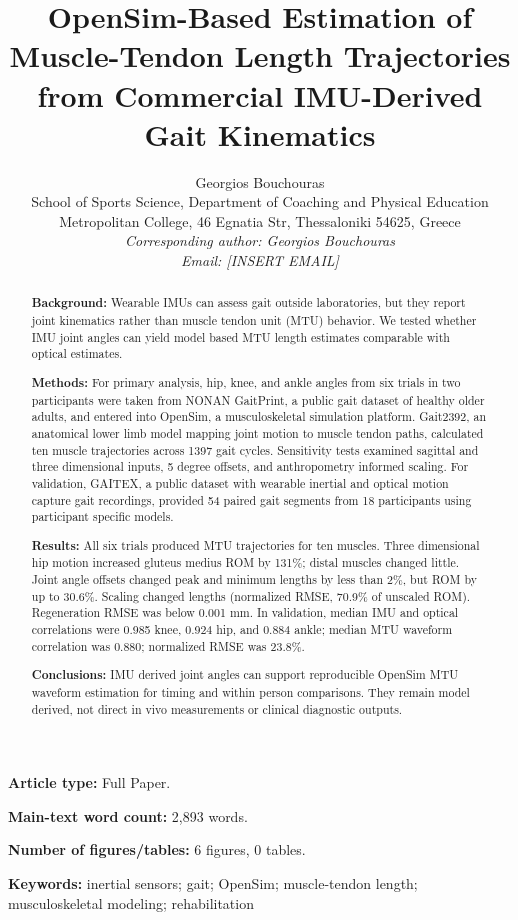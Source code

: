 \documentclass[11pt]{article}
\title{OpenSim-Based Estimation of Muscle-Tendon Length Trajectories\\
from Commercial IMU-Derived Gait Kinematics}
\author{\small Georgios Bouchouras\\
School of Sports Science, Department of Coaching and Physical Education\\
Metropolitan College, 46 Egnatia Str, Thessaloniki 54625, Greece\\
\textit{Corresponding author: Georgios Bouchouras}\\
\textit{Email: [INSERT EMAIL]}}
\date{}
\begin{document}
\maketitle

\noindent\textbf{Article type:} Full Paper.\par
\noindent\textbf{Main-text word count:} 2,893 words.\par
\noindent\textbf{Number of figures/tables:} 6 figures, 0 tables.

\begin{abstract}
\textbf{Background:} Wearable IMUs can assess gait outside laboratories, but they report joint kinematics rather than muscle tendon unit (MTU) behavior. We tested whether IMU joint angles can yield model based MTU length estimates comparable with optical estimates.\par
\textbf{Methods:} For primary analysis, hip, knee, and ankle angles from six trials in two participants were taken from NONAN GaitPrint, a public gait dataset of healthy older adults, and entered into OpenSim, a musculoskeletal simulation platform. Gait2392, an anatomical lower limb model mapping joint motion to muscle tendon paths, calculated ten muscle trajectories across 1397 gait cycles. Sensitivity tests examined sagittal and three dimensional inputs, 5 degree offsets, and anthropometry informed scaling. For validation, GAITEX, a public dataset with wearable inertial and optical motion capture gait recordings, provided 54 paired gait segments from 18 participants using participant specific models.\par
\textbf{Results:} All six trials produced MTU trajectories for ten muscles. Three dimensional hip motion increased gluteus medius ROM by 131\%; distal muscles changed little. Joint angle offsets changed peak and minimum lengths by less than 2\%, but ROM by up to 30.6\%. Scaling changed lengths (normalized RMSE, 70.9\% of unscaled ROM). Regeneration RMSE was below 0.001 mm. In validation, median IMU and optical correlations were 0.985 knee, 0.924 hip, and 0.884 ankle; median MTU waveform correlation was 0.880; normalized RMSE was 23.8\%.\par
\textbf{Conclusions:} IMU derived joint angles can support reproducible OpenSim MTU waveform estimation for timing and within person comparisons. They remain model derived, not direct in vivo measurements or clinical diagnostic outputs.
\end{abstract}

\noindent\textbf{Keywords:} inertial sensors; gait; OpenSim; muscle-tendon length; musculoskeletal modeling; rehabilitation
\end{document}
